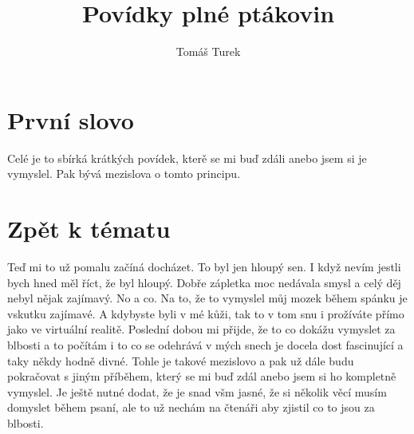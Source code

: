 \documentclass{book}
\author{Tomáš Turek}
\title{Povídky plné ptákovin}
\begin{document}
	\maketitle
	
	\section{První slovo}
	
	Celé je to sbírká krátkých povídek, kterě se mi buď zdáli anebo jsem si je vymyslel. Pak bývá mezislova o tomto principu.
	
	
	
	\section{Zpět k tématu}
	
	
	Teď mi to už pomalu začíná docházet. To byl jen hloupý sen. I když nevím jestli bych hned měl říct, že byl hloupý. Dobře zápletka moc nedávala smysl a celý děj nebyl nějak zajímavý. No a co. Na to, že to vymyslel můj mozek během spánku je vskutku zajímavé. A kdybyste byli v mé kůži, tak to v tom snu i prožíváte přímo jako ve virtuální realitě. Poslední dobou mi přijde, že to co dokážu vymyslet za blbosti a to počítám i to co se odehrává v mých snech je docela dost fascinující a taky někdy hodně divné. Tohle je takové mezislovo a pak už dále budu pokračovat s jiným příběhem, který se mi buď zdál anebo jsem si ho kompletně vymyslel. Je ještě nutné dodat, že je snad všm jasné, že si několik věcí musím domyslet během psaní, ale to už nechám na čtenáři aby zjistil co to jsou za blbosti.
	
	
	
	
\end{document}

